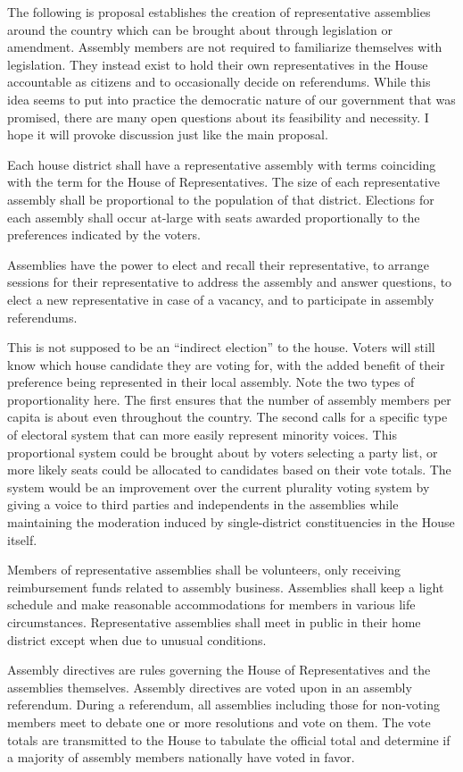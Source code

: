 \documentclass{article}
\newcommand{\quotes}[1]{``#1''}
\begin{document}
The following is proposal establishes the creation of representative assemblies around the country which can be brought about through legislation or amendment. Assembly members are not required to familiarize themselves with legislation. They instead exist to hold their own representatives in the House accountable as citizens and to occasionally decide on referendums. While this idea seems to put into practice the democratic nature of our government that was promised, there are many open questions about its feasibility and necessity. I hope it will provoke discussion just like the main proposal.

\begin{quoting}
Each house district shall have a representative assembly with terms coinciding with the term for the House of Representatives. The size of each representative assembly shall be proportional to the population of that district. Elections for each assembly shall occur at-large with seats awarded proportionally to the preferences indicated by the voters.

Assemblies have the power to elect and recall their representative, to arrange sessions for their representative to address the assembly and answer questions, to elect a new representative in case of a vacancy, and to participate in assembly referendums.
\end{quoting}

This is not supposed to be an \quotes{indirect election} to the house. Voters will still know which house candidate they are voting for, with the added benefit of their preference being represented in their local assembly. Note the two types of proportionality here. The first ensures that the number of assembly members per capita is about even throughout the country. The second calls for a specific type of electoral system that can more easily represent minority voices. This proportional system could be brought about by voters selecting a party list, or more likely seats could be allocated to candidates based on their vote totals. The system would be an improvement over the current plurality voting system by giving a voice to third parties and independents in the assemblies while maintaining the moderation induced by single-district constituencies in the House itself.

\begin{quoting}
Members of representative assemblies shall be volunteers, only receiving reimbursement funds related to assembly business. Assemblies shall keep a light schedule and make reasonable accommodations for members in various life circumstances. Representative assemblies shall meet in public in their home district except when due to unusual conditions.

Assembly directives are rules governing the House of Representatives and the assemblies themselves. Assembly directives are voted upon in an assembly referendum. During a referendum, all assemblies including those for non-voting members meet to debate one or more resolutions and vote on them. The vote totals are transmitted to the House to tabulate the official total and determine if a majority of assembly members nationally have voted in favor.
\end{quoting}
\end{document}
